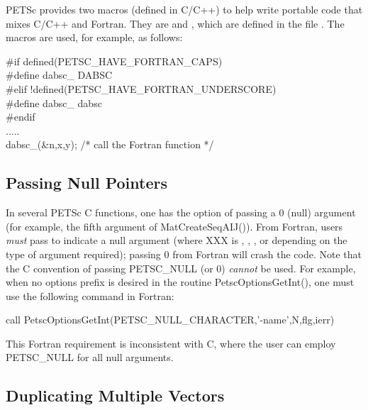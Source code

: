 PETSc provides two macros (defined in C/C++) to help write 
portable code that mixes C/C++ and Fortran. They are 
 and 
 ,
which are defined in the file .
The macros are used, for example, as follows:
\begin{tabbing}
   \#if defined(PETSC\_HAVE\_FORTRAN\_CAPS)\\
   \#define dabsc\_ DABSC\\
   \#elif !defined(PETSC\_HAVE\_FORTRAN\_UNDERSCORE)\\
   \#define dabsc\_ dabsc\\
   \#endif\\
   .....\\
   dabsc\_(\&n,x,y); /* call the Fortran function */
\end{tabbing}


\subsection{Passing Null Pointers}

In several PETSc C functions, one has the option of passing a 0 (null)
argument (for example, the fifth argument of MatCreateSeqAIJ()).
From Fortran, users {\em must} pass  to indicate a
null argument (where XXX is , , ,
or  depending on the type of argument required); 
 passing  0 from 
 Fortran   will crash
the code.   Note
that the C convention of passing PETSC_NULL (or 0) {\em cannot}
be used.  For example, when no options prefix is desired in the
routine PetscOptionsGetInt(), one must use the following command in
Fortran:
\begin{tabbing}
    call PetscOptionsGetInt(PETSC\_NULL\_CHARACTER,'-name',N,flg,ierr)
\end{tabbing}

This Fortran requirement is inconsistent with C, where the 
user can employ PETSC_NULL for all null arguments. 

\subsection{Duplicating Multiple Vectors}
\label{sec_fortvecd}

